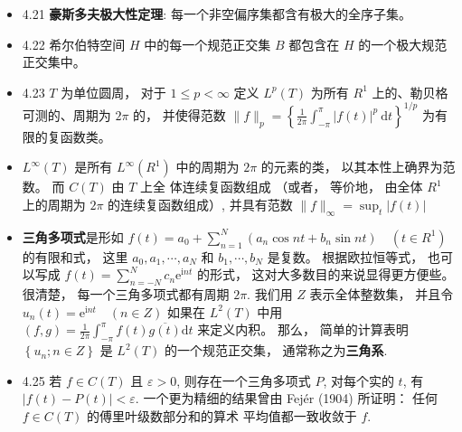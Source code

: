\begin{itemize}
\item 4.21 \textbf{豪斯多夫极大性定理}: 每一个非空偏序集都含有极大的全序子集。

\item 4.22 希尔伯特空间 $H$ 中的每一个规范正交集 $B$ 都包含在 $H$ 的一个极大规范正交集中。

\item 4.23 $T$ 为单位圆周， 对于 $1 \leqslant p<\infty$ 定义 $L^{p}(T)$ 为所有 $R^{1}$ 上的、勒贝格可测的、周期为 $2 \pi$ 的， 并使得范数 $\|f\|_{p}=\left\{\frac{1}{2 \pi} \int_{-\pi}^{\pi}|f(t)|^{p} \mathrm{~d} t\right\}^{1 / p}$ 为有限的复函数类。

\item $L^{\infty}(T)$ 是所有 $L^{\infty}\left(R^{1}\right)$ 中的周期为 $2 \pi$ 的元素的类， 以其本性上确界为范数。 而 $C(T)$ 由 $T$ 上全 体连续复函数组成 （或者， 等价地， 由全体 $R^{1}$ 上的周期为 $2 \pi$ 的连续复函数组成）, 并具有范数 $\|f\|_{\infty}=\sup _{t}|f(t)|$

\item \textbf{三角多项式}是形如 $f(t)=a_{0}+\sum_{n=1}^{N}\left(a_{n} \cos n t+b_{n} \sin n t\right) \quad\left(t \in R^{1}\right)$ 的有限和式， 这里 $a_{0}, a_{1}, \cdots, a_{N}$ 和 $b_{1}, \cdots, b_{N}$ 是复数。 根据欧拉恒等式， 也可以写成 $f(t)=\sum_{n=-N}^{N} c_{n} \mathrm{e}^{\mathrm{i} n t}$ 的形式， 这对大多数目的来说显得更方便些。 很清楚， 每一个三角多项式都有周期 $2 \pi$. 我们用 $Z$ 表示全体整数集， 并且令 $u_{n}(t)=\mathrm{e}^{\mathrm{i} n t} \quad(n \in Z)$ 如果在 $L^{2}(T)$ 中用 $(f, g)=\frac{1}{2 \pi} \int_{-\pi}^{\pi} f(t) \overline{g(t)} \mathrm{d} t$ 来定义内积。 那么， 简单的计算表明 $\left\{u_{n} ; n \in Z\right\}$ 是 $L^{2}(T)$ 的一个规范正交集， 通常称之为\textbf{三角系}.

\item 4.25 若 $f \in C(T)$ 且 $\varepsilon>0$, 则存在一个三角多项式 $P$, 对每个实的 $t$, 有 $|f(t)-P(t)|<\varepsilon$. 一个更为精细的结果曾由 Fejér (1904) 所证明： 任何 $f \in C(T)$ 的傅里叶级数部分和的算术 平均值都一致收敛于 $f$.


\end{itemize}

